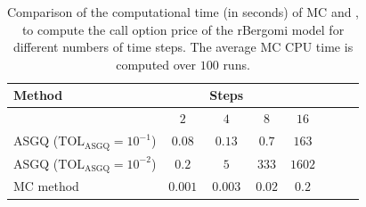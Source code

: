 \begin{table}[htbp]
	\centering
	\begin{tabular}{l*{6}{c}r}
		\toprule[1.5pt]
	Method & & Steps  & &     \\
	\hline
	        & $2$ & $4$ & $8$  &$16$  \\
		\hline
		ASGQ ($\text{TOL}_{\text{ASGQ}}=10^{-1}$)  & $0.08$ & $0.13$ & $0.7$  & $163$ \\
		ASGQ ($\text{TOL}_{\text{ASGQ}}=10^{-2}$)  & $0.2$& $5$ & $333$ &  $1602$\\
%	
		\hline	
		MC method & $0.001$  & $0.003$  & $0.02$ & $0.2$ \\
		\bottomrule[1.25pt]	
	\end{tabular}
	\caption{Comparison of the computational time (in seconds) of  MC and , to compute the call option price of the rBergomi model for different numbers of time steps. The average MC CPU time is computed over $100$ runs.}
	\label{Comparsion of the computational time of  MC and MISC, used to compute Call option price of rBergomi model for different number of time steps. Case $K=1, H=0.07$, linear}
\end{table}
\FloatBarrier

